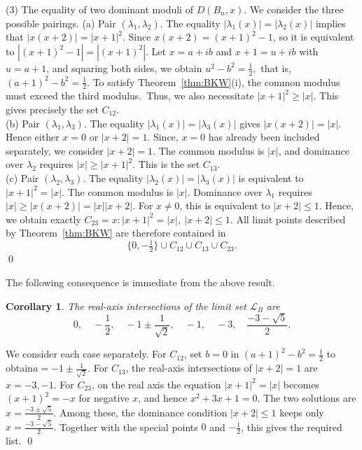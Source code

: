 \documentclass[12pt]{article}
\newtheorem{corollary}[theorem]{Corollary}
\theoremstyle{definition}
\renewenvironment{proof}{{\noindent\bfseries Proof.}}{\qed}
\begin{document}
\begin{proof}
		\noindent(3) The equality of two dominant moduli of $D(B_n,x)$. We consider the three possible pairings.  (a) Pair $(\lambda_1,\lambda_2)$. The equality $|\lambda_1(x)|=|\lambda_2(x)|$ implies that $|x(x+2)|=|x+1|^2.$ Since $x(x+2)=(x+1)^2-1$, so it is equivalent to $|(x+1)^2-1|=|(x+1)^2|.$ Let $x=a+ib$ and $x+1=u+ib$ with $u=a+1$, and squaring both sides, we obtain
		$u^2-b^2=\frac12,$ 	that is, $ (a+1)^2-b^2=\frac12.$ To satisfy Theorem~\ref{thm:BKW}\textup{(i)}, the common modulus must exceed the third modulus. Thus, we also necessitate $ |x+1|^2\ge |x|. $ This gives precisely the set $C_{12}$.\\
		(b) Pair $(\lambda_1,\lambda_3)$. The equality $|\lambda_1(x)|=|\lambda_3(x)|$ gives $|x(x+2)|=|x|. $ Hence either $x=0$ or $|x+2|=1$. Since, $x=0$ has already been included separately, we consider $|x+2|=1.$ The common modulus is $|x|$, and dominance over $\lambda_2$ requires $|x|\ge |x+1|^2.$  This is the set $C_{13}$.\\
		(c) Pair $(\lambda_2,\lambda_3)$. The equality $|\lambda_2(x)|=|\lambda_3(x)|$ is equivalent to $|x+1|^2=|x|.$ The common modulus is $|x|$. Dominance over $\lambda_1$ requires $|x|\ge |x(x+2)|=|x||x+2|.$ For $x\neq 0$, this is equivalent to $|x+2|\le 1$. Hence, we obtain exactly $C_{23}={x: |x+1|^2=|x|,\ |x+2|\le 1}.$ All limit points described by Theorem~\ref{thm:BKW} are therefore contained in
		$$
		\{0,-\tfrac12\}\cup C_{12}\cup C_{13}\cup C_{23}.
		$$
	\end{proof}
	
	The following consequence is immediate from the above result.
	\begin{corollary}\label{cor:realintersections}
		The real-axis intersections of the limit set $\mathcal{L}_B$ are
		$$
		0,\quad -\frac12,\quad -1\pm \frac{1}{\sqrt2},\quad -1,\quad -3,\quad \frac{-3-\sqrt5}{2}.
		$$
	\end{corollary}
	
	\begin{proof}
		We consider each case separately. For $C_{12}$, set $b=0$ in $(a+1)^2-b^2=\tfrac12$ to obtain$a=-1\pm \frac{1}{\sqrt2}.$ For $C_{13}$, the real-axis intersections of $|x+2|=1$ are 	$x=-3,-1.$ 	For $C_{23}$, on the real axis the equation $|x+1|^2=|x|$ becomes $(x+1)^2=-x$ 	for negative $x$, and hence $x^2+3x+1=0.$ The two solutions are
		$x=\frac{-3\pm \sqrt5}{2}.$ Among these, the dominance condition $|x+2|\le 1$ keeps only $x=\frac{-3-\sqrt5}{2}.$ Together with the special points $0$ and $-\tfrac12$, this gives the required list.
	\end{proof}
	
\end{document}
